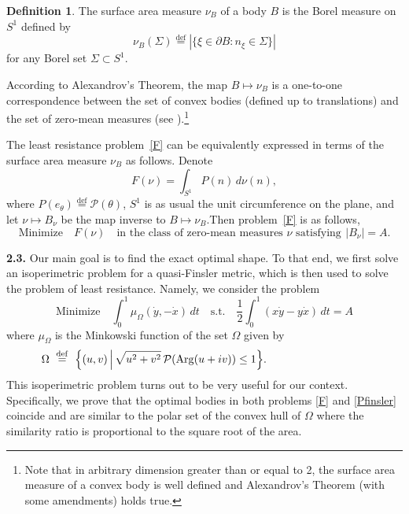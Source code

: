 \documentclass[a4paper,12pt]{article}
\newcommand{\eqdef}{\stackrel{\mathrm{def}}{=}}
\newcommand {\FF}{F}
\newcommand {\FFF}{\mathcal{F}}
\newcommand {\PP}{P}
\newcommand {\PPP}{\mathcal{P}}
\theoremstyle{remark}
\theoremstyle{definition}
\newtheorem{definition}{Definition}
\begin{document}
\begin{definition}
The surface area measure $\nu_B$ of a body $B$ is the Borel measure on $S^1$ defined by
$$
\nu_B(\Sigma) \eqdef |\{ \xi \in \partial B : n_\xi \in \Sigma \}|
$$
for any Borel set $\Sigma \subset S^1$.
\end{definition}

According to Alexandrov's Theorem, the map $B \mapsto \nu_B$ is a one-to-one correspondence between the set of convex bodies (defined up to translations) and the set of zero-mean measures (see \cite{Aleksandrov}).\footnote{Note that  in arbitrary dimension greater than or equal to 2, the surface area measure of a convex body is well defined and Alexandrov's Theorem (with some amendments) holds true.}

The least resistance problem~\eqref{F} can be equivalently expressed in terms of the surface area measure $\nu_B$ as follows. Denote
\begin{equation}\label{Fmeas}
\FF(\nu) = \int_{S^1} \PP(n)\, d\nu(n),
\end{equation}
where $\PP(e_\theta) \eqdef \PPP(\theta)$, $S^1$ is as usual the unit circumference on the plane,
and let $\nu \mapsto B_\nu$ be the map inverse to $B \mapsto \nu_B$.Then problem~\eqref{F} is as follows,
\begin{equation}\label{nu}
\text{Minimize} \quad \FF(\nu) \quad \text{in the class of zero-mean measures $\nu$ satisfying} \ \, |B_\nu| = A.
\end{equation}



\bigskip

{\bf 2.3.}
Our main goal is to find the exact optimal shape. To that end, we first solve an isoperimetric problem for a quasi-Finsler metric, which is then used to solve the problem of least resistance. Namely, we consider the problem
\begin{equation}\label{Pfinsler}
    \text{Minimize}\quad
    \int_0^1\mu_{\Omega}(\dot y,-\dot x)\,dt
    \quad\text{s.t.}\quad
    \frac12\int_0^1(x\dot y-y\dot x)\,dt=A
\end{equation}
where $\mu_\Omega$ is the Minkowski function of the set $\Omega$ given by
\begin{equation}
	\label{eq: Omega}
\Omega\ \eqdef\ \Big\{(u,v)\,\Big|\, \sqrt{u^2+v^2}\,\PPP(\operatorname{Arg}(u+iv)) \le 1 \Big\}.
\hspace{32mm}
\end{equation}
This isoperimetric problem turns out to be very useful for our context. Specifically, we prove that the optimal bodies in both problems \eqref{F} and \eqref{Pfinsler} coincide and are similar to the polar set of the convex hull of $\Omega$ where the similarity ratio is proportional to the square root of the area.
\vspace{2mm}
\end{document}
